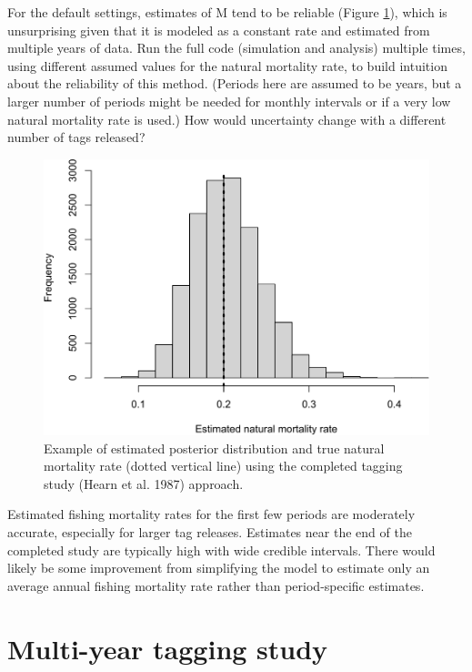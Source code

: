 \documentclass[
]{krantz}
\begin{document}
For the default settings, estimates of M tend to be reliable (Figure \ref{fig:HearnPlot}), which is unsurprising given that it is modeled as a constant rate and estimated from multiple years of data. Run the full code (simulation and analysis) multiple times, using different assumed values for the natural mortality rate, to build intuition about the reliability of this method. (Periods here are assumed to be years, but a larger number of periods might be needed for monthly intervals or if a very low natural mortality rate is used.) How would uncertainty change with a different number of tags released?

\begin{figure}
\includegraphics[width=0.9\linewidth]{bookdown_files/figure-latex/HearnPlot-1} \caption{Example of estimated posterior distribution and true natural mortality rate (dotted vertical line) using the completed tagging study (Hearn et al. 1987) approach.}\label{fig:HearnPlot}
\end{figure}

Estimated fishing mortality rates for the first few periods are moderately accurate, especially for larger tag releases. Estimates near the end of the completed study are typically high with wide credible intervals. There would likely be some improvement from simplifying the model to estimate only an average annual fishing mortality rate rather than period-specific estimates.

\hypertarget{BrownieFandM}{%
\section{Multi-year tagging study}\label{BrownieFandM}}
\end{document}
